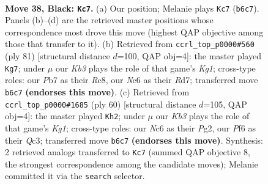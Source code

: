 \documentclass[11pt]{article}
\begin{document}
\clearpage

\begin{figure}[p]\centering
\begin{subfigure}{0.46\textwidth}\centering
\resizebox{\linewidth}{!}{%
\newchessgame
\chessboard[
  setfen={r7/1p4p1/pkn2pN1/2Q3np/3R4/4P1P1/PPR2PBP/6K1 b - - 6 38},
  showmover=false,
  pgfstyle=straightmove, color=movearrow, markmove={b6-c7}
]}
\caption{}
\end{subfigure}\hfill
\begin{subfigure}{0.46\textwidth}\centering
\resizebox{\linewidth}{!}{%
\newchessgame
\chessboard[
  setfen={2r3k1/3r4/5pP1/pP1npP2/P2n4/1p6/3Q1R1P/3B2K1 b - - 1 41},
  showmover=false,
  pgfstyle=straightmove, color=movearrow, markmove={g8-g7}
]}
\caption{}
\end{subfigure}
\\[4pt]
\begin{subfigure}{0.46\textwidth}\centering
\resizebox{\linewidth}{!}{%
\newchessgame
\chessboard[
  setfen={5k2/1p3pp1/1pnpr2p/8/P1P1q3/1PQR1N1P/5PP1/6K1 w - - 11 31},
  showmover=false,
  pgfstyle=straightmove, color=movearrow, markmove={g1-h2}
]}
\caption{}
\end{subfigure}\hfill

\caption{\textbf{Move 38, Black: \texttt{Kc7}.} (a) Our position; Melanie plays \texttt{Kc7} (\texttt{b6c7}). Panels (b)--(d) are the retrieved master positions whose correspondence most drove this move (highest QAP objective among those that transfer to it). (b) Retrieved from \texttt{ccrl\_top\_p0000\#560} (ply 81) [structural distance $d$=100, QAP obj=4]: the master played \texttt{Kg7}; under $\mu$ our \emph{Kb3} plays the role of that game's \emph{Kg1}; cross-type roles: our \emph{P}b7 as their \emph{R}c8, our \emph{N}c6 as their \emph{R}d7; transferred move \texttt{b6c7} \textbf{(endorses this move)}. (c) Retrieved from \texttt{ccrl\_top\_p0000\#1685} (ply 60) [structural distance $d$=105, QAP obj=4]: the master played \texttt{Kh2}; under $\mu$ our \emph{Kb3} plays the role of that game's \emph{Kg1}; cross-type roles: our \emph{N}c6 as their \emph{P}g2, our \emph{P}f6 as their \emph{Q}c3; transferred move \texttt{b6c7} \textbf{(endorses this move)}. Synthesis: 2 retrieved analogs transferred to \texttt{Kc7} (summed QAP objective 8, the strongest correspondence among the candidate moves); Melanie committed it via the \texttt{search} selector.}
\label{fig:thought-m75}
\end{figure}

\clearpage
\end{document}
